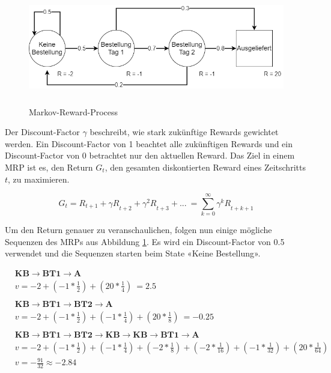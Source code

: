  \begin{figure}[ht]
  \centering
  \includegraphics[height=5cm]{img/Markov_Reward_Prozess.png}
  \caption{Markov-Reward-Process}
  \label{mrp_draw}
\end{figure}

Der Discount-Factor $\gamma$ beschreibt, wie stark zukünftige Rewards gewichtet werden. Ein Discount-Factor von 1 beachtet alle zukünftigen Rewards und ein Discount-Factor von 0 betrachtet nur den aktuellen Reward. Das Ziel in einem MRP ist es, den Return $G_t$, den gesamten diskontierten Reward eines Zeitschritts $t$, zu maximieren.

\begin{equation}
    G_t=R_{t+1}+{\gamma R}_{t+2}+{\gamma^2R}_{t+3}+...\ =\sum_{k=0}^{\infty}{\gamma^kR}_{t+k+1}
\end{equation}

\newpage
Um den Return genauer zu veranschaulichen, folgen nun einige mögliche Sequenzen des MRPs aus Abbildung \ref{mrp_draw}. Es wird ein Discount-Factor von 0.5 verwendet und die Sequenzen starten beim State «Keine Bestellung».



\begin{align}
    &\boldsymbol{KB\xrightarrow{}BT1\xrightarrow{}A}\nonumber\\
    &v=-2+(-1\ast\frac{1}{2})+(20\ast\frac{1}{4})\ =2.5\\ \nonumber\\
    &\boldsymbol{KB\xrightarrow{}BT1\xrightarrow{}BT2\xrightarrow{}A}\nonumber\\
    &v=-2+(-1\ast\frac{1}{2})+(-1\ast\frac{1}{4})+(20\ast\frac{1}{8})\ =-0.25\\ \nonumber\\
    &\boldsymbol{KB\xrightarrow{}BT1\xrightarrow{}BT2\xrightarrow{}KB\xrightarrow{}KB\xrightarrow{}BT1\xrightarrow{}A}\nonumber\\
    &v=-2+(-1\ast\frac{1}{2})+(-1\ast\frac{1}{4})+(-2\ast\frac{1}{8})+(-2\ast\frac{1}{16})+(-1\ast\frac{1}{32})+(20\ast\frac{1}{64}) \nonumber\\
    &v=-\frac{91}{32}\approx-2.84
\end{align}



